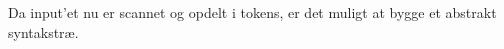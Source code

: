 \noindent Da input'et nu er scannet og opdelt i tokens, er det muligt at bygge et abstrakt syntakstræ. \cite{Sebesta_2013}





